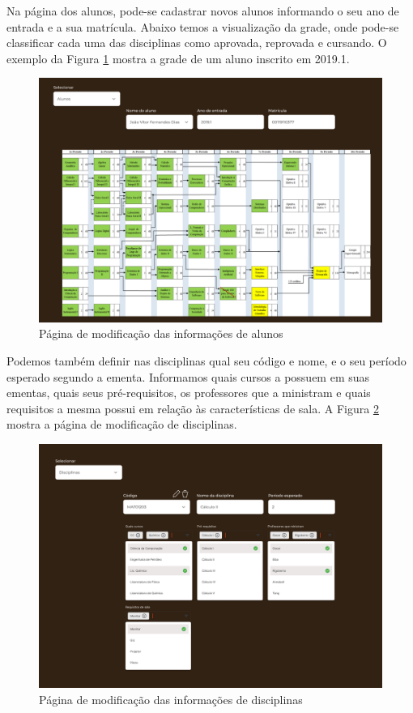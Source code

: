     Na página dos alunos, pode-se cadastrar novos alunos informando o seu ano de entrada e a sua matrícula. Abaixo temos a visualização da grade, onde pode-se classificar cada uma das disciplinas como aprovada, reprovada e cursando. O exemplo da Figura \ref{fig:CRUD_alunos} mostra a grade de um aluno inscrito em 2019.1.

    \begin{figure}[htbp]\centering
        \caption{\label{fig:CRUD_alunos} Página de modificação das informações de alunos}
        \includegraphics[scale=0.6]{files/img/Prototipo/Medio/CRUD_alunos.png}
    \end{figure} %

    Podemos também definir nas disciplinas qual seu código e nome, e o seu período esperado segundo a ementa. Informamos quais cursos a possuem em suas ementas, quais seus pré-requisitos, os professores que a ministram e quais requisitos a mesma possui em relação às características de sala. A Figura \ref{fig:CRUD_disciplinas} mostra a página de modificação de disciplinas.

    \begin{figure}[htbp]\centering
        \caption{\label{fig:CRUD_disciplinas} Página de modificação das informações de disciplinas}
        \includegraphics[scale=0.6]{files/img/Prototipo/Medio/CRUD_disciplinas.png}
    \end{figure} %

